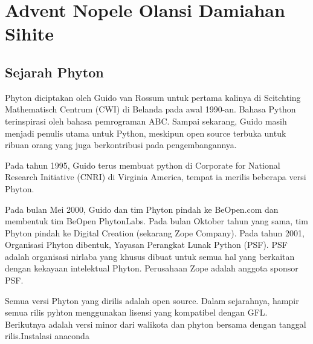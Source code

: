 
\section{Advent Nopele Olansi Damiahan Sihite}
\subsection{Sejarah Phyton}
Phyton diciptakan oleh Guido van Rossum untuk pertama kalinya di Scitchting Mathematisch Centrum (CWI) di Belanda pada awal 1990-an. Bahasa Python terinspirasi oleh bahasa pemrograman ABC. Sampai sekarang, Guido masih menjadi penulis utama untuk Python, meskipun open source terbuka untuk ribuan orang yang juga berkontribusi pada pengembangannya.
\par
Pada tahun 1995, Guido terus membuat python di Corporate for National Research Initiative (CNRI) di Virginia America, tempat ia merilis beberapa versi Phyton.
\par
Pada bulan Mei 2000, Guido dan tim Phyton pindah ke BeOpen.com dan membentuk tim BeOpen PhytonLabs. Pada bulan Oktober tahun yang sama, tim Phyton pindah ke Digital Creation (sekarang Zope Company). Pada tahun 2001, Organisasi Phyton dibentuk, Yayasan Perangkat Lunak Python (PSF). PSF adalah organisasi nirlaba yang khusus dibuat untuk semua hal yang berkaitan dengan kekayaan intelektual Phyton. Perusahaan Zope adalah anggota sponsor PSF.
\par
Semua versi Phyton yang dirilis adalah open source. Dalam sejarahnya, hampir semua rilis pyhton menggunakan lisensi yang kompatibel dengan GFL. Berikutnya adalah versi minor dari walikota dan phyton bersama dengan tanggal rilis.Instalasi anaconda
